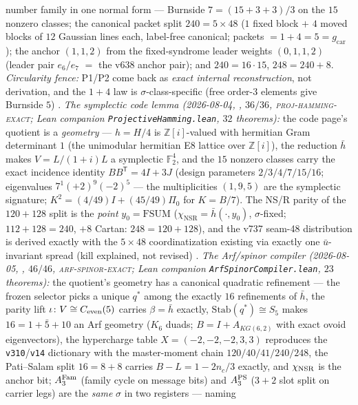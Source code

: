\documentclass[11pt,a4paper]{article}
\newcommand{\gcar}{g_{\mathrm{car}}}
\newcommand{\Z}{\mathbb{Z}}
\theoremstyle{definition}
\begin{document}
\begin{winbox}
number family in one normal form --- Burnside $7=(15+3+3)/3$ on the
$15$ nonzero classes; the canonical packet split $240=5\times48$
($1$ fixed block $+$ $4$ moved blocks of $12$ Gaussian lines each,
label-free canonical; packets $=1+4=5=\gcar$); the anchor $(1,1,2)$
from the fixed-syndrome leader weights $(0,1,1,2)$ (leader pair
$e_6/e_7$ $=$ the v638 anchor pair); and $240=16\cdot15$,
$248=240+8$.  \emph{Circularity fence:} P1/P2 come back as
\emph{exact internal reconstruction}, not derivation, and the $1+4$
law is $\sigma$-class-specific (free order-$3$ elements give
Burnside $5$) \mE.
\emph{The symplectic code lemma (2026-08-04,
, $36/36$,
\textsc{proj-hamming-exact}; Lean companion
\texttt{ProjectiveHamming.lean}, $32$ theorems):} the code page's
quotient is a \emph{geometry} --- $h=H/4$ is $\Z[i]$-valued with
hermitian Gram determinant $1$ (the unimodular hermitian E8 lattice
over $\Z[i]$), the reduction $\bar h$ makes $V=L/(1+i)L$ a
symplectic $\mathbb{F}_2^4$, and the $15$ nonzero classes carry the
exact incidence identity $BB^{\mathsf T}=4I+3J$ (design parameters
$2/3/4/7/15/16$; eigenvalues $7^1(+2)^9(-2)^5$ --- the
multiplicities $(1,9,5)$ are the symplectic signature;
$K^2=(4/49)I+(45/49)\Pi_0$ for $K=B/7$).  The NS/R parity of the
$120+128$ split is the \emph{point} $y_0=\mathrm{FSUM}$
($\chi_{\mathrm{NSR}}=\bar h(\cdot,y_0)$, $\sigma$-fixed;
$112+128=240$, $+8$ Cartan: $248=120+128$), and the v737 seam-48
distribution is derived exactly with the $5\times48$
coordinatization existing via exactly one $\bar u$-invariant spread
(kill explained, not revised) \mE.
\emph{The Arf/spinor compiler (2026-08-05,
, $46/46$,
\textsc{arf-spinor-exact}; Lean companion
\texttt{ArfSpinorCompiler.lean}, $23$ theorems):} the quotient's
geometry has a canonical quadratic refinement --- the frozen
selector picks a unique $q^{*}$ among the exactly $16$ refinements
of $\bar h$, the parity lift $\iota\colon V\cong C_{\rm even}(5)$
carries $\beta=\bar h$ exactly, $\mathrm{Stab}(q^{*})\cong S_5$
makes $16=1+\bar 5+10$ an Arf geometry ($K_6$ duads;
$B=I+A_{KG(6,2)}$ with exact ovoid eigenvectors), the hypercharge
table $X=(-2,-2,-2,3,3)$ reproduces the \texttt{v310}/\texttt{v14}
dictionary with the master-moment chain $120/40/41/240/248$, the
Pati--Salam split $16=8+8$ carries $B{-}L=1-2n_c/3$ exactly, and
$\chi_{\rm NSR}$ is the anchor bit; $A_3^{\rm Fam}$ (family cycle
on message bits) and $A_3^{\rm PS}$ ($3{+}2$ slot split on carrier
legs) are the \emph{same} $\sigma$ in two registers --- naming

\end{winbox}
\end{document}
